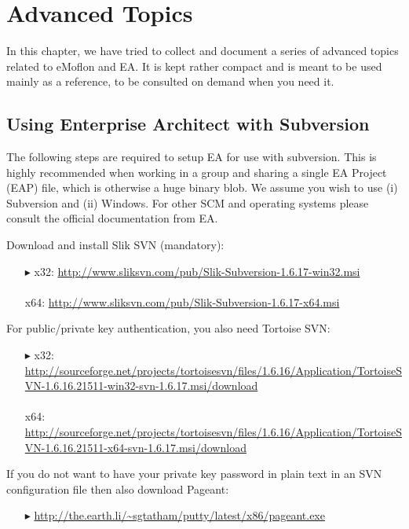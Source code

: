 \chapter{Advanced Topics}
\label{chap:advanced_topics}

In this chapter, we have tried to collect and document a series of advanced topics related to eMoflon and EA.
It is kept rather compact and is meant to be used mainly as a reference, to be consulted on demand when you need it.

\section{Using Enterprise Architect with Subversion}
The following steps are required to setup EA for use with subversion.
This is highly recommended when working in a group and sharing a single EA Project (EAP) file, which is otherwise a huge binary blob.
We assume you wish to use (i) Subversion and (ii) Windows.
For other SCM and operating systems please consult the official documentation from EA.

Download and install Slik SVN (mandatory):
\begin{enumerate}
  \item[$\blacktriangleright$] x32: {\small \url{http://www.sliksvn.com/pub/Slik-Subversion-1.6.17-win32.msi}}\\\\
   x64: {\small \url{http://www.sliksvn.com/pub/Slik-Subversion-1.6.17-x64.msi}}
\end{enumerate}

For public/private key authentication, you also need Tortoise SVN:
 
\begin{enumerate}
  \item[$\blacktriangleright$] x32: {\small \url{http://sourceforge.net/projects/tortoisesvn/files/1.6.16/Application/TortoiseSVN-1.6.16.21511-win32-svn-1.6.17.msi/download}}\\\\
  x64: {\small\url{http://sourceforge.net/projects/tortoisesvn/files/1.6.16/Application/TortoiseSVN-1.6.16.21511-x64-svn-1.6.17.msi/download}}
\end{enumerate}

If you do not want to have your private key password in plain text in an SVN configuration file then also download Pageant:
\begin{enumerate}
  \item[$\blacktriangleright$] {\small \url{http://the.earth.li/~sgtatham/putty/latest/x86/pageant.exe}}  
\end{enumerate}

